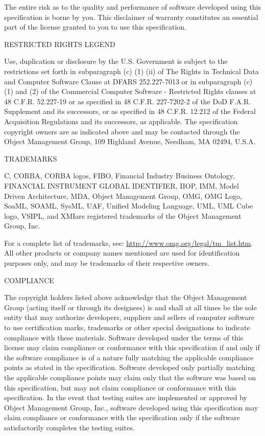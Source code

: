 \documentclass[10pt, a4paper]{isov2}
\newcommand{\rtm}[0]{\small{\textregistered\xspace}}
\newcommand{\OMGparagraph}[1]{
\vspace{23pt}
{\centerline {#1}}
\vspace{3pt}
}
\begin{document}
The entire risk as to the quality and performance of software developed using this specification is borne by you. This disclaimer of warranty constitutes an essential part of the license granted to you to use this specification.


\OMGparagraph{RESTRICTED RIGHTS LEGEND}
Use, duplication or disclosure by the U.S. Government is subject to the restrictions set forth in 
 subparagraph (c) (1) (ii) of The Rights in Technical Data and Computer Software Clause at DFARS 
  252.227-7013 or in subparagraph (c)(1) and (2) of the Commercial Computer Software - Restricted 
   Rights clauses at 48 C.F.R. 52.227-19 or as specified in 48 C.F.R. 227-7202-2 of the DoD F.A.R. 
    Supplement and its successors, or as specified in 48 C.F.R. 12.212 of the Federal Acquisition 
 Regulations and its successors, as applicable. The specification copyright owners are as 
 indicated above and may be contacted through the Object Management Group, 109 Highland 
 Avenue, Needham, MA 02494, U.S.A.
  


\OMGparagraph{TRADEMARKS}

C\rtm, CORBA\rtm, CORBA logos\rtm, FIBO\rtm, Financial Industry Business Ontology\rtm, FINANCIAL INSTRUMENT GLOBAL IDENTIFIER\rtm,  IIOP\rtm, IMM\rtm, Model Driven Architecture\rtm, MDA\rtm, Object Management Group\rtm, OMG\rtm, OMG Logo\rtm, SoaML\rtm, SOAML\rtm, SysML\rtm, UAF\rtm, Unified Modeling Language\rtm, UML\rtm, UML Cube logo\rtm, VSIPL\rtm, and XMI\rtm are registered trademarks of the Object Management Group, Inc. 

For a complete list of trademarks, see: \url{http://www.omg.org/legal/tm_list.htm}. All other products or company names mentioned are used for identification purposes only, and may be trademarks of their respective owners.

\OMGparagraph{COMPLIANCE}
The copyright holders listed above acknowledge that the Object Management Group (acting itself or through its designees) is and shall at all times be the sole entity that may authorize developers, suppliers and sellers of computer software to use certification marks, trademarks or other special designations to indicate compliance with these materials.
Software developed under the terms of this license may claim compliance or conformance with this specification if and only if the software compliance is of a nature fully matching the applicable compliance points as stated in the specification. Software developed only partially matching the applicable compliance points may claim only that the software was based on this specification, but may not claim compliance or conformance with this specification. In the event that testing suites are implemented or approved by Object Management Group, Inc., software developed using this specification may claim compliance or conformance with the specification only if the software satisfactorily completes the testing suites.
\end{document}
